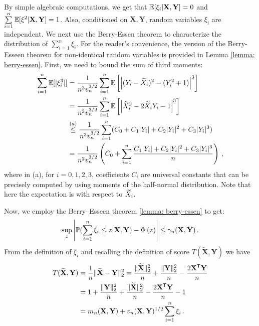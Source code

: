 \documentclass[11pt]{article}
\def\bX{\mathbf{X}}
\def\bY{\mathbf{Y}}
\def\tbX{\widetilde{\bX}}
\begin{document}
By simple algebraic computations, we get that $\E[\xi_i|\bX,\bY]=0$ and $\sum\limits_{i=1}^{n} \E[\xi^2|\bX,\bY]=1$. Also, conditioned on $\bX,\bY$, random variables $\xi_i$ are independent. We next use the Berry-Essen theorem to characterize the distribution of $\sum_{i=1}^n \xi_i$. For the reader's convenience, the version of the Berry-Esseen theorem for non-identical random variables is provided in Lemma \ref{lemma: berry-essen}.  First, we need to bound the sum of third moments:
\begin{align*}
\sum\limits_{i=1}^{n}{\mathbb E}[|\xi_i^3|]&=\frac{1}{n^3v_n^{3/2}}\sum\limits_{i=1}^{n}{\mathbb E} \left[\left | (Y_i-{\widetilde{X}}_i)^2-(Y_i^2+1) \right|^3 \right]\\
&= \frac{1}{n^3v_n^{3/2}}\sum\limits_{i=1}^{n}{\mathbb E} \left[\left | {\widetilde{X}}_i^2-2{\widetilde{X}}_iY_i -1 \right|^3 \right]\\
&\overset{(a)}{\leq} \frac{1}{n^3v_n^{3/2}}\sum\limits_{i=1}^{n} (C_0+C_1|Y_i|+C_2|Y_i|^2+C_3|Y_i|^3)\\
&= \frac{1}{n^2 v_n^{3/2} } \left( C_0+ \sum\limits_{i=1}^{n}\frac{C_1|Y_i|+C_2|Y_i|^2+C_3|Y_i|^3}{n} \right)\,,
\end{align*}
where in (a), for $i=0,1,2,3$, coefficients $C_i$ are universal constants that can be precisely computed by using moments of the half-normal distribution. Note that here the expectation is with respect to ${\widetilde{X}}_i$.


Now, we employ the Berry–Esseen theorem \ref{lemma: berry-essen} to get:
%
\begin{align}\label{eq: berry-1}
\sup\limits_{z}^{}\left|\prob(  \sum\limits_{i=1}^{n} \xi_i \leq z  | \bX,\bY )- \Phi\left( z  \right) \right |  \leq \gamma_n(\bX,\bY)\,.
\end{align}
%
From the definition of $\xi_i$ and recalling the definition of score $T(\tbX,\bY)$ we have
\begin{align*}
 T(\tbX,\bY)& = \frac{1}{n}\|\tbX-\bY\|_2^2 = \frac{\|\tbX\|_2^2}{n}+\frac{\|\bY\|_2^2}{n} - \frac{2\bX^\sT\bY}{n}\\
 & = 1+ \frac{\|\bY\|_2^2}{n} + \frac{\|\tbX\|_2^2}{n}- \frac{2\bX^\sT\bY}{n} - 1\\
 & = m_n(\bX,\bY)  + v_n(\bX,\bY)^{1/2}\sum_{i=1}^n \xi_i\,.
\end{align*}
\end{document}
